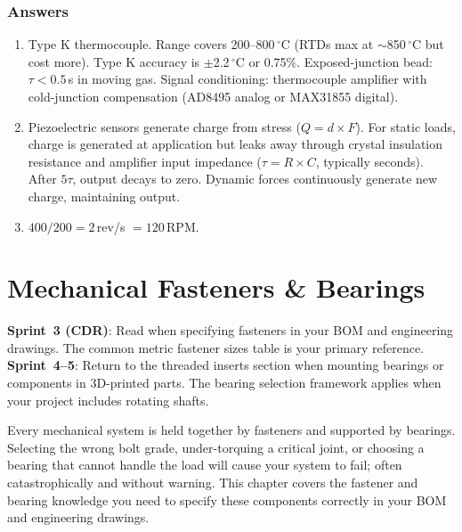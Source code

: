 \documentclass[11pt,letterpaper,twoside,openany]{book}
\newcommand{\degC}{\ensuremath{{}^{\circ}\text{C}}}
\begin{document}
\subsection{Answers}
\begin{enumerate}[leftmargin=1.5em]
\item Type K thermocouple. Range covers 200--800\,\degC{} (RTDs max at $\sim$850\,\degC{} but cost more). Type K accuracy is $\pm$2.2\,\degC{} or 0.75\%. Exposed-junction bead: $\tau < 0.5$\,s in moving gas. Signal conditioning: thermocouple amplifier with cold-junction compensation (AD8495 analog or MAX31855 digital).
\item Piezoelectric sensors generate charge from stress ($Q = d \times F$). For static loads, charge is generated at application but leaks away through crystal insulation resistance and amplifier input impedance ($\tau = R \times C$, typically seconds). After $5\tau$, output decays to zero. Dynamic forces continuously generate new charge, maintaining output.
\item $400 / 200 = 2$\,rev/s $= 120$\,RPM.
\end{enumerate}





\chapter{Mechanical Fasteners \& Bearings}\label{ch:fasteners}

\begin{tipbox}
\textbf{Sprint~3 (CDR)}: Read when specifying fasteners in your BOM and engineering drawings. The common metric fastener sizes table is your primary reference. \textbf{Sprint~4--5}: Return to the threaded inserts section when mounting bearings or components in 3D-printed parts. The bearing selection framework applies when your project includes rotating shafts.
\end{tipbox}


\vspace{1em}

Every mechanical system is held together by fasteners and supported by bearings. Selecting the wrong bolt grade, under-torquing a critical joint, or choosing a bearing that cannot handle the load will cause your system to fail; often catastrophically and without warning. This chapter covers the fastener and bearing knowledge you need to specify these components correctly in your BOM and engineering drawings.
\end{document}
